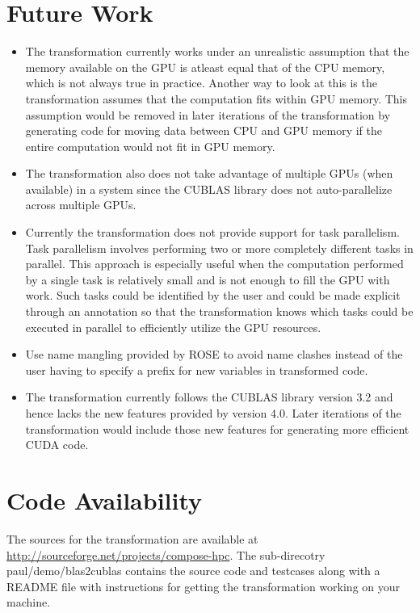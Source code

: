 \documentclass[12pt,a4paper]{article}
\begin{document}
\section{Future Work}
  \begin{itemize}
 \item The transformation currently works under an unrealistic assumption that
the memory available on the GPU is atleast equal that of the CPU memory, which
is not always true in practice. Another way to look at this is the transformation 
assumes that the computation fits within GPU memory. This assumption would
be removed in later iterations of the transformation by generating code for moving data between CPU 
and GPU memory if the entire computation would not fit in GPU memory.
 \item The transformation also does not take advantage of multiple GPUs (when
available) in a system since the CUBLAS library does not auto-parallelize
across multiple GPUs.
 \item Currently the transformation does not provide support for task parallelism.
Task parallelism involves performing two or more completely different tasks 
in parallel. This approach is especially useful when the computation performed 
by a single task is relatively small and is not enough to fill the GPU with work.
Such tasks could be identified by the user and could be made explicit through
an annotation so that the transformation knows which tasks could be executed 
in parallel to efficiently utilize the GPU resources.
\item Use name mangling provided by ROSE to avoid name clashes instead of
the user having to specify a prefix for new variables in transformed code.
\item The transformation currently follows the CUBLAS library version 3.2 and
hence lacks the new features provided by version 4.0. Later iterations of the transformation would include those new features for generating more efficient
CUDA code.

\end{itemize}
  
\section{Code Availability}
The sources for the transformation are available at \url{http://sourceforge.net/projects/compose-hpc}. 
The sub-direcotry paul/demo/blas2cublas contains the source code and testcases
along with a README file with instructions for getting the transformation working
on your machine.




\end{document}
